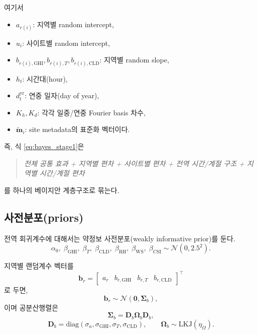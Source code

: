 \documentclass[11pt,a4paper]{article}
\begin{document}
여기서
\begin{itemize}[leftmargin=2em]
    \item $a_{r(i)}$: 지역별 random intercept,
    \item $u_i$: 사이트별 random intercept,
    \item $b_{r(i),\mathrm{GHI}}, b_{r(i),T}, b_{r(i),\mathrm{CLD}}$: 지역별 random slope,
    \item $h_t$: 시간대(hour),
    \item $d_t^{\mathrm{yr}}$: 연중 일자(day of year),
    \item $K_h, K_d$: 각각 일중/연중 Fourier basis 차수,
    \item $\widetilde{\bm m}_i$: site metadata의 표준화 벡터이다.
\end{itemize}

즉, 식 \eqref{eq:bayes_stage1}은
\begin{quote}
\textit{전체 공통 효과 + 지역별 편차 + 사이트별 편차 + 전역 시간/계절 구조 + 지역별 시간/계절 편차}
\end{quote}
를 하나의 베이지안 계층구조로 묶는다.

\subsection{사전분포(priors)}
전역 회귀계수에 대해서는 약정보 사전분포(weakly informative prior)를 둔다.
\begin{equation}
    \alpha_0,\; \beta_{\mathrm{GHI}},\; \beta_T,\; \beta_{\mathrm{CLD}},\; \beta_{\mathrm{RH}},\; \beta_{\mathrm{WS}},\; \beta_{\mathrm{CSI}} \sim \mathcal N(0, 2.5^2).
\end{equation}

지역별 랜덤계수 벡터를
\begin{equation}
    \bm b_r =
    \begin{bmatrix}
        a_r & b_{r,\mathrm{GHI}} & b_{r,T} & b_{r,\mathrm{CLD}}
    \end{bmatrix}^{\top}
\end{equation}
로 두면,
\begin{equation}
    \bm b_r \sim \mathcal N(\bm 0, \bm \Sigma_b),
\end{equation}
이며 공분산행렬은
\begin{equation}
    \bm \Sigma_b = \bm D_b \bm \Omega_b \bm D_b,
\end{equation}
\begin{equation}
    \bm D_b = \mathrm{diag}(\sigma_a,\sigma_{\mathrm{GHI}},\sigma_T,\sigma_{\mathrm{CLD}}),
    \qquad \bm \Omega_b \sim \mathrm{LKJ}(\eta_{\Omega}).
\end{equation}
\end{document}
